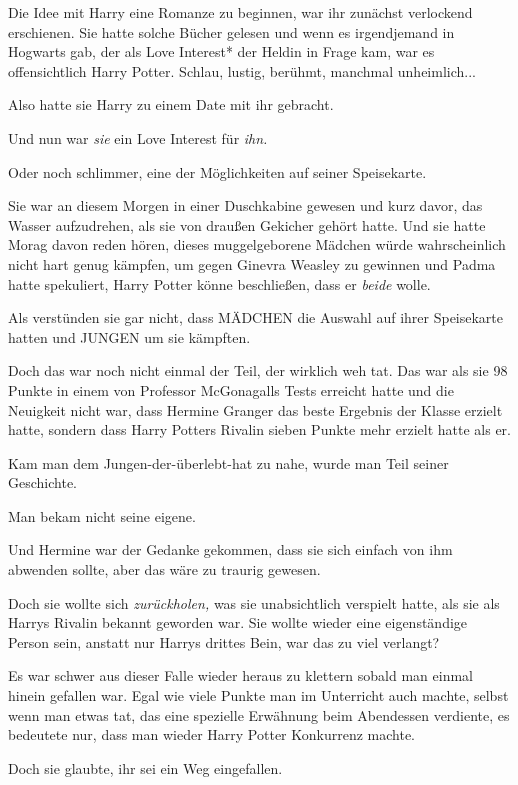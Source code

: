{Die Idee mit Harry eine Romanze zu beginnen, war ihr zunächst verlockend erschienen. Sie hatte solche Bücher gelesen und wenn es irgendjemand in Hogwarts gab, der als Love Interest* der Heldin in Frage kam, war es offensichtlich Harry Potter. Schlau, lustig, berühmt, manchmal unheimlich...

Also hatte sie Harry zu einem Date mit ihr gebracht.

Und nun war \emph{sie} ein Love Interest für \emph{ihn.}

Oder noch schlimmer, eine der Möglichkeiten auf seiner Speisekarte.

Sie war an diesem Morgen in einer Duschkabine gewesen und kurz davor, das Wasser aufzudrehen, als sie von draußen Gekicher gehört hatte. Und sie hatte Morag davon reden hören, dieses muggelgeborene Mädchen würde wahrscheinlich nicht hart genug kämpfen, um gegen Ginevra Weasley zu gewinnen und Padma hatte spekuliert, Harry Potter könne beschließen, dass er \emph{beide} wolle.

Als verstünden sie gar nicht, dass MÄDCHEN die Auswahl auf ihrer Speisekarte hatten und JUNGEN um sie kämpften.

Doch das war noch nicht einmal der Teil, der wirklich weh tat. Das war als sie 98 Punkte in einem von Professor McGonagalls Tests erreicht hatte und die Neuigkeit nicht war, dass Hermine Granger das beste Ergebnis der Klasse erzielt hatte, sondern dass Harry Potters Rivalin sieben Punkte mehr erzielt hatte als er.

Kam man dem Jungen-der-überlebt-hat zu nahe, wurde man Teil seiner Geschichte.

Man bekam nicht seine eigene.

Und Hermine war der Gedanke gekommen, dass sie sich einfach von ihm abwenden sollte, aber das wäre zu traurig gewesen.

Doch sie wollte sich \emph{zurückholen,} was sie unabsichtlich verspielt hatte, als sie als Harrys Rivalin bekannt geworden war. Sie wollte wieder eine eigenständige Person sein, anstatt nur Harrys drittes Bein, war das zu viel verlangt?

Es war schwer aus dieser Falle wieder heraus zu klettern sobald man einmal hinein gefallen war. Egal wie viele Punkte man im Unterricht auch machte, selbst wenn man etwas tat, das eine spezielle Erwähnung beim Abendessen verdiente, es bedeutete nur, dass man wieder Harry Potter Konkurrenz machte.

Doch sie glaubte, ihr sei ein Weg eingefallen.

}
